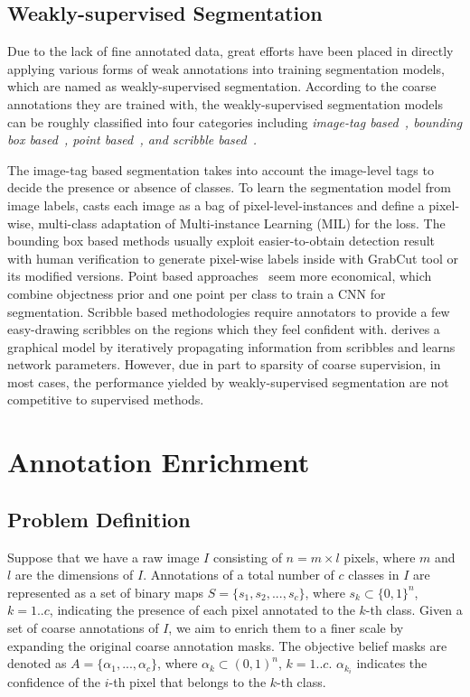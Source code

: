 \documentclass[sigconf]{acmart}
\begin{document}
\subsection{Weakly-supervised Segmentation}
Due to the lack of fine annotated data, great efforts have been placed in directly applying various forms of weak annotations into training segmentation models, which are named as weakly-supervised segmentation. According to the coarse annotations they are trained with, the weakly-supervised segmentation models can be roughly classified into four categories including \textit{image-tag based~\cite{image,zhang2013sparse,AE-PSL,AF-SS}, bounding box based~\cite{wssl,boxsup}, point based~\cite{point}, and scribble based~\cite{scribbleup,lazysnapping,rother2004grabcut}. }

The image-tag based segmentation takes into account the image-level tags to decide the presence or absence of classes. To learn the segmentation model from image labels, \cite{image} casts each image as a bag of pixel-level-instances and define a pixel-wise, multi-class adaptation of Multi-instance Learning (MIL) for the loss. The bounding box based methods usually exploit easier-to-obtain detection result with human verification to generate pixel-wise labels inside with
GrabCut\cite{rother2004grabcut} tool or its modified versions. Point based approaches~\cite{point} seem more economical, which combine objectness prior and one point per class to train a CNN for segmentation.
Scribble based methodologies require annotators to provide a few easy-drawing scribbles on the regions which they feel confident with. \cite{scribbleup} derives a graphical model by iteratively propagating information from scribbles and learns network parameters. However, due in part to sparsity of coarse supervision, in most cases, the performance yielded by weakly-supervised segmentation are not competitive to supervised methods.
\section{Annotation Enrichment}
\subsection{Problem Definition}
Suppose that we have a raw image $I$ consisting of $n=m\times l$ pixels, where $m$ and $l$ are the dimensions of $I$. Annotations of a total number of $c$ classes in $I$ are represented as a set of binary maps $S = \{s_{1}, s_2, ..., s_{c}\}$, where $s_k \subset \{0,1\}^n$, $k=1..c$, indicating the presence of each pixel annotated to the $k$-th class. Given a set of coarse annotations of $I$, we aim to enrich them to a finer scale by expanding the original coarse annotation masks. The objective belief masks are denoted as $A = \{\alpha_1, ..., \alpha_c\}$, where $\alpha_k \subset (0,1)^n$, $k=1..c$. $\alpha_{k_i}$ indicates the confidence of the $i$-th pixel that belongs to the $k$-th class.
\end{document}
